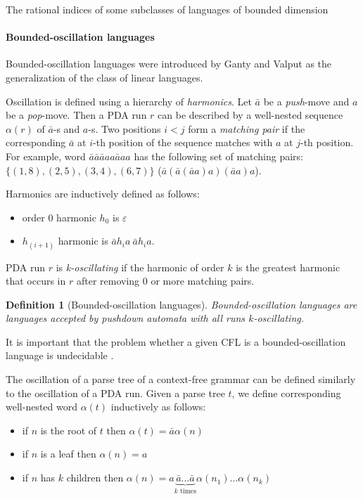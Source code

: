 \documentclass[11pt,a4paper]{article} %
\newtheorem{definition}{Definition}
\begin{document}
\begin{subsection}{The rational indices of some subclasses of languages of bounded dimension}
\paragraph{Bounded-oscillation languages}
 Bounded-oscillation languages were introduced by Ganty and Valput \cite{BoundOsc} as the generalization of the class of linear languages. 

Oscillation is defined using a hierarchy of \textit{harmonics}. Let $\bar{a}$ be a \textit{push}-move and $a$ be a \textit{pop}-move. Then a PDA run $r$ can be described by a well-nested sequence $\alpha(r)$ of $\bar{a}$-s and $a$-s. Two positions $i<j$ form a \textit{matching pair} if the corresponding $\bar{a}$ at $i$-th position of the sequence matches with $a$ at $j$-th position. For example, word $\bar{a}\bar{a}\bar{a}aa\bar{a}aa$ has the following set of matching pairs: $\{(1, 8), (2, 5), (3, 4), (6, 7)\}$ ($\bar{a}(\bar{a}(\bar{a}a)a)(\bar{a}a)a$).


Harmonics are inductively defined as follows:
\begin{itemize}
\item  order 0 harmonic $h_0$ is $\varepsilon$
\item  $h_{(i+1)}$ harmonic is $\bar{a}h_ia\ \bar{a}h_ia$.
\end{itemize}

PDA run $r$ is \textit{k-oscillating} if the harmonic of order $k$ is the greatest harmonic that occurs in $r$ after removing $0$ or more matching pairs. 

\begin{definition}[Bounded-oscillation languages]
Bounded-oscillation languages are languages accepted by pushdown automata with all runs $k$-oscillating. 
\end{definition}
It is important that the problem whether a given CFL is a bounded-oscillation language is undecidable \cite{BoundOsc}.

The oscillation of a parse tree of a context-free grammar can be defined similarly to the oscillation of a PDA run. Given a parse tree $t$, we define corresponding well-nested word $\alpha(t)$ inductively as follows:
\begin{itemize}
\item if $n$ is the root of $t$ then $\alpha(t) = \bar{a}\alpha(n)$
\item if $n$ is a leaf then $\alpha(n)=a$
\item if $n$ has $k$ children then $\alpha(n) = a\underbrace{\bar{a}...\bar{a}}_\text{$k$ times}\alpha(n_1)...\alpha(n_k)$
\end{itemize}



\end{subsection}
\end{document}
